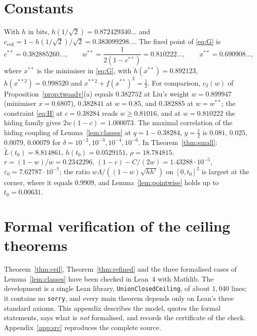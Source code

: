 \documentclass[11pt,a4paper]{article}
\theoremstyle{definition}
\theoremstyle{remark}
\newcommand{\ent}{h}
\begin{document}
\appendix
\section{Constants}\label{app:const}
With $\ent$ in bits, $\ent(1/\sqrt2)=0.872429340\ldots$ and $c_{\mathrm{ceil}}=1-\ent(1/\sqrt2)/\sqrt2=0.383099298\ldots$. The fixed point of \eqref{eq:G} is
\[c^{**}=0.382885260\ldots,\qquad w^{**}=\frac1{2(1-c^{**})}=0.810222\ldots,\qquad x^{**}=0.690908\ldots,\]
where $x^{**}$ is the minimiser in \eqref{eq:G}, with $\ent(x^{**})=0.892123$, $\ent(x^{**2})=0.998520$ and $x^{**2}+f(x^{**})^2=\frac12$. For comparison, $c_2(w)$ of Proposition~\ref{prop:twoadv}(a) equals $0.382752$ at Liu's weight $w=0.899947$ (minimiser $x=0.6807$), $0.382841$ at $w=0.85$, and $0.382885$ at $w=w^{**}$; the constraint \eqref{eq:H} at $c=0.38284$ reads $w\ge0.81016$, and at $w=0.810222$ the hiding family gives $2w(1-c)=1.000073$. The maximal correlation of the hiding coupling of Lemma~\ref{lem:classes} at $q=1-0.38284$, $y=\frac12$ is $0.081$, $0.025$, $0.0079$, $0.00079$ for $\delta=10^{-2},10^{-3},10^{-4},10^{-6}$. In Theorem~\ref{thm:small}: $\tilde L(t_0)=8.814861$, $\ent(t_0)=0.0529151$, $\rho=18.784815$, $r=(1-w)/w=0.2342296$, $(1-c)-C/(2w)=1.43288\cdot10^{-5}$, $\varepsilon_0=7.62787\cdot10^{-7}$; the ratio $w\Lambda/((1-w)\sqrt{\ent\ent'})$ on $[0,t_0]^2$ is largest at the corner, where it equals $0.9909$, and Lemma~\ref{lem:pointwise} holds up to $t_0=0.00631$.


\section{Formal verification of the ceiling theorems}\label{app:lean}
\sloppy
Theorem~\ref{thm:ceil}, Theorem~\ref{thm:refined} and the three formalised cases of
Lemma~\ref{lem:classes} have been checked in Lean~4 with Mathlib. The development is a
single Lean library, \texttt{UnionClosedCeiling}, of about $1{,}040$ lines; it contains no
\texttt{sorry}, and every main theorem depends only on Lean's three standard axioms. This
appendix describes the model, quotes the formal statements, says what is \emph{not}
formalised, and records the certificate of the check. Appendix~\ref{app:src} reproduces the
complete source.
\end{document}
